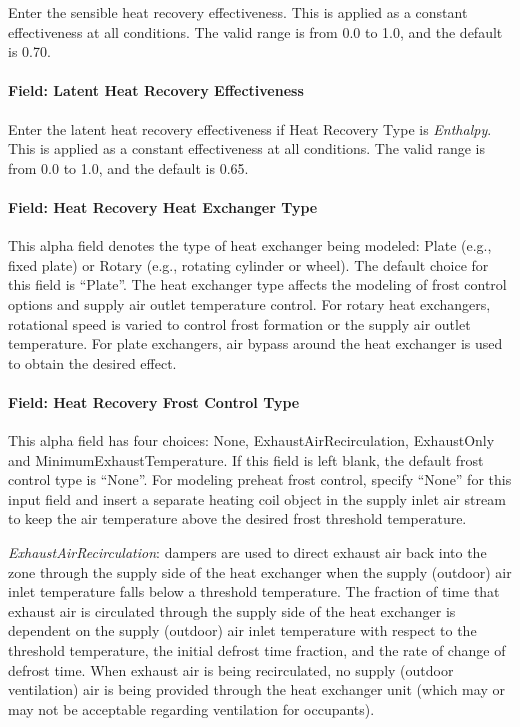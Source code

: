 Enter the sensible heat recovery effectiveness. This is applied as a constant effectiveness at all conditions. The valid range is from 0.0 to 1.0, and the default is 0.70.

\paragraph{Field: Latent Heat Recovery Effectiveness}\label{field-latent-heat-recovery-effectiveness-6}

Enter the latent heat recovery effectiveness if Heat Recovery Type is \emph{Enthalpy}. This is applied as a constant effectiveness at all conditions. The valid range is from 0.0 to 1.0, and the default is 0.65.

\paragraph{Field: Heat Recovery Heat Exchanger Type}\label{field-heat-recovery-heat-exchanger-type-1}

This alpha field denotes the type of heat exchanger being modeled: Plate (e.g., fixed plate) or Rotary (e.g., rotating cylinder or wheel). The default choice for this field is ``Plate''. The heat exchanger type affects the modeling of frost control options and supply air outlet temperature control. For rotary heat exchangers, rotational speed is varied to control frost formation or the supply air outlet temperature. For plate exchangers, air bypass around the heat exchanger is used to obtain the desired effect.

\paragraph{Field: Heat Recovery Frost Control Type}\label{field-heat-recovery-frost-control-type-1}

This alpha field has four choices: None, ExhaustAirRecirculation, ExhaustOnly and MinimumExhaustTemperature. If this field is left blank, the default frost control type is ``None''. For modeling preheat frost control, specify ``None'' for this input field and insert a separate heating coil object in the supply inlet air stream to keep the air temperature above the desired frost threshold temperature.

\emph{ExhaustAirRecirculation}: dampers are used to direct exhaust air back into the zone through the supply side of the heat exchanger when the supply (outdoor) air inlet temperature falls below a threshold temperature. The fraction of time that exhaust air is circulated through the supply side of the heat exchanger is dependent on the supply (outdoor) air inlet temperature with respect to the threshold temperature, the initial defrost time fraction, and the rate of change of defrost time. When exhaust air is being recirculated, no supply (outdoor ventilation) air is being provided through the heat exchanger unit (which may or may not be acceptable regarding ventilation for occupants).

